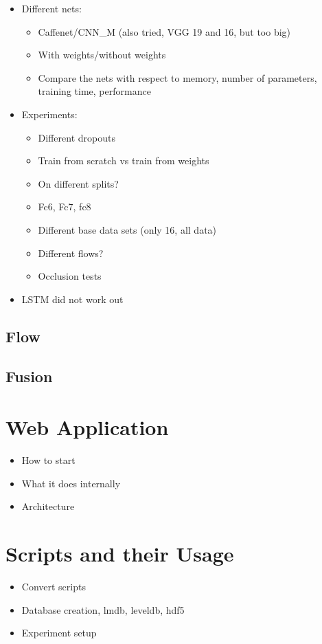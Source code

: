 \documentclass[a4paper,12pt,headsepline,pagesize,bibtotoc,titlepage]{scrartcl}
\begin{document}
\begin{itemize}
	\item
		Different nets:
		\begin{itemize}
			\item Caffenet/CNN\_M (also tried, VGG 19 and 16, but too big)
			\item With weights/without weights
			\item Compare the nets with respect to memory, number of parameters, training time, performance
		\end{itemize}
	\item
		Experiments:
		\begin{itemize}
			\item Different dropouts
			\item Train from scratch vs train from weights
			\item On different splits?
			\item Fc6, Fc7, fc8
			\item Different base data sets (only 16, all data)
			\item Different flows?
			\item Occlusion tests
		\end{itemize}
	\item
		LSTM did not work out
\end{itemize}


\subsection{Flow}
\subsection{Fusion}

\section{Web Application}
\begin{itemize}
	\item How to start
	\item What it does internally
	\item Architecture
\end{itemize}
\section{Scripts and their Usage}
\begin{itemize}
	\item Convert scripts
	\item Database creation, lmdb, leveldb, hdf5
	\item Experiment setup
\end{itemize}
\end{document}
